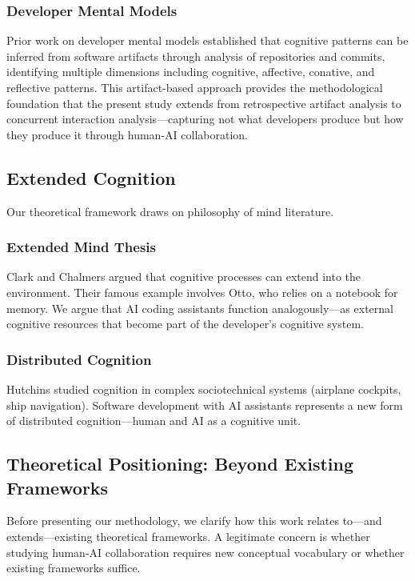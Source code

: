 \documentclass{ntlabs-preprint}
\begin{document}
\subsubsection{Developer Mental Models}

Prior work on developer mental models \citep{silva2025dmmf} established that cognitive patterns can be inferred from software artifacts through analysis of repositories and commits, identifying multiple dimensions including cognitive, affective, conative, and reflective patterns. This artifact-based approach provides the methodological foundation that the present study extends from retrospective artifact analysis to concurrent interaction analysis---capturing not what developers produce but how they produce it through human-AI collaboration.

\subsection{Extended Cognition}

Our theoretical framework draws on philosophy of mind literature.

\subsubsection{Extended Mind Thesis}

Clark and Chalmers \citep{clark1998extended} argued that cognitive processes can extend into the environment. Their famous example involves Otto, who relies on a notebook for memory. We argue that AI coding assistants function analogously---as external cognitive resources that become part of the developer's cognitive system.

\subsubsection{Distributed Cognition}

Hutchins \citep{hutchins1995cognition} studied cognition in complex sociotechnical systems (airplane cockpits, ship navigation). Software development with AI assistants represents a new form of distributed cognition---human and AI as a cognitive unit.

\subsection{Theoretical Positioning: Beyond Existing Frameworks}

Before presenting our methodology, we clarify how this work relates to---and extends---existing theoretical frameworks. A legitimate concern is whether studying human-AI collaboration requires new conceptual vocabulary or whether existing frameworks suffice.
\end{document}
